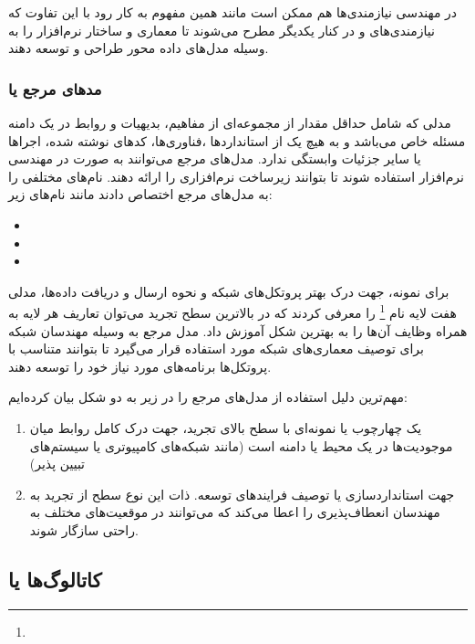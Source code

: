 در مهندسی نیازمندی‌ها هم ممکن است مانند همین مفهوم به کار رود با این تفاوت که
نیازمندی‌های  و  در کنار یکدیگر مطرح می‌شوند
تا معماری و ساختار نرم‌افزار را به وسیله مدل‌های داده محور طراحی و توسعه دهند.

\subsubsection{مد‌های مرجع یا }

مدلی که شامل حداقل مقدار از مجموعه‌ای از مفاهیم، بدیهیات و روابط در یک دامنه
مسئله خاص می‌باشد و به هیچ یک از استاندارد‌ها ،فناوری‌ها، کد‌های نوشته شده،
اجراها یا سایر جزئیات وابستگی ندارد. مدل‌های مرجع می‌توانند به صورت
 در مهندسی نرم‌افزار استفاده شوند تا بتوانند زیرساخت نرم‌افزاری را
ارائه دهند. نام‌های مختلفی را به مدل‌های مرجع اختصاص دادند مانند نام‌های زیر:

\begin{itemize}
    \item {}
    \item {}
    \item {}
\end{itemize}

برای نمونه، جهت درک بهتر پروتکل‌های شبکه و نحوه ارسال و دریافت داده‌ها، مدلی هفت
لایه نام \footnote{}  را معرفی کردند که
در بالاترین‌ سطح تجرید می‌توان تعاریف هر لایه به همراه وظایف آن‌ها را به بهترین
شکل آموزش داد. مدل مرجع  به وسیله مهندسان شبکه برای توصیف معماری‌های
شبکه مورد استفاده قرار می‌گیرد تا بتوانند متناسب با پروتکل‌ها برنامه‌های مورد
نیاز خود را توسعه دهند.

مهم‌ترین دلیل استفاده از مدل‌های مرجع را در زیر به دو شکل بیان کرده‌ایم:

\begin{enumerate}
    \item یک چهارچوب یا نمونه‌ای با سطح بالای تجرید، جهت درک کامل روابط میان
    موجودیت‌ها در یک محیط یا دامنه است (مانند شبکه‌های کامپیوتری یا سیستم‌های
    تبیین پذیر)
    \item جهت استانداردسازی یا توصیف فرایند‌های توسعه. ذات این نوع سطح از تجرید
    به مهندسان انعطاف‌پذیری را اعطا می‌کند که می‌توانند در موقعیت‌های مختلف به
    راحتی سازگار شوند.
\end{enumerate}


\subsection{کاتالوگ‌ها یا }

